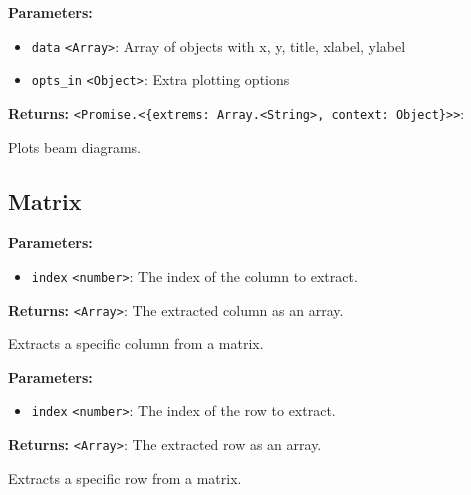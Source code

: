 \documentclass[12pt,a4paper]{article}
\begin{document}
\noindent \textbf{Parameters:}
\begin{itemize}
  \item \texttt{data} \texttt{<Array>}: Array of objects with x, y, title, xlabel, ylabel
  \item \texttt{opts\_in} \texttt{<Object>}: Extra plotting options
\end{itemize}

\noindent \textbf{Returns:} \texttt{<Promise.<\{extrems: Array.<String>, context: Object\}>>}: 

\noindent Plots beam diagrams.


\subsection{Matrix}
\vspace{5mm}
\noindent {}


\noindent \textbf{Parameters:}
\begin{itemize}
  \item \texttt{index} \texttt{<number>}: The index of the column to extract.
\end{itemize}

\noindent \textbf{Returns:} \texttt{<Array>}: The extracted column as an array.

\noindent Extracts a specific column from a matrix.

\vspace{5mm}
\noindent {}


\noindent \textbf{Parameters:}
\begin{itemize}
  \item \texttt{index} \texttt{<number>}: The index of the row to extract.
\end{itemize}

\noindent \textbf{Returns:} \texttt{<Array>}: The extracted row as an array.

\noindent Extracts a specific row from a matrix.

\vspace{5mm}
\noindent {}
\end{document}
